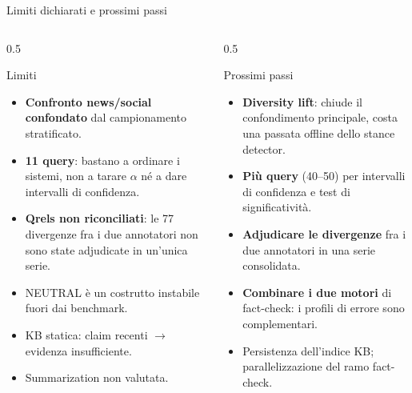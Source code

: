 \documentclass[aspectratio=169,11pt]{beamer}
\begin{document}
\begin{frame}{Limiti dichiarati e prossimi passi}
  \begin{columns}[T]
    \begin{column}{0.5\textwidth}
      \begin{alertblock}{\small Limiti}
        \scriptsize
        \begin{itemize}\scriptsize
          \item \textbf{Confronto news/social confondato} dal campionamento stratificato.
          \item \textbf{11 query}: bastano a ordinare i sistemi, non a tarare $\alpha$ né a
                dare intervalli di confidenza.
          \item \textbf{Qrels non riconciliati}: le 77 divergenze fra i due annotatori non
                sono state adjudicate in un'unica serie.
          \item NEUTRAL è un costrutto instabile fuori dai benchmark.
          \item KB statica: claim recenti $\to$ evidenza insufficiente.
          \item Summarization non valutata.
        \end{itemize}
      \end{alertblock}
    \end{column}
    \begin{column}{0.5\textwidth}
      \begin{block}{\small Prossimi passi}
        \scriptsize
        \begin{itemize}\scriptsize
          \item \textbf{Diversity lift}: chiude il confondimento principale, costa una
                passata offline dello stance detector.
          \item \textbf{Più query} (40--50) per intervalli di confidenza e test di
                significatività.
          \item \textbf{Adjudicare le divergenze} fra i due annotatori in una serie
                consolidata.
          \item \textbf{Combinare i due motori} di fact-check: i profili di errore sono
                complementari.
          \item Persistenza dell'indice KB; parallelizzazione del ramo fact-check.
        \end{itemize}
      \end{block}
    \end{column}
  \end{columns}
\end{frame}
\end{document}
